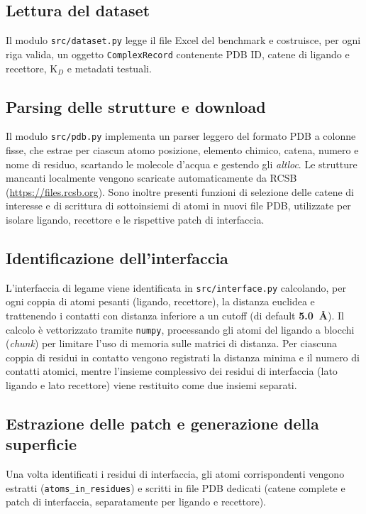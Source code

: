 \documentclass[11pt,a4paper]{article}
\begin{document}
\subsection{Lettura del dataset}
Il modulo \texttt{src/dataset.py} legge il file Excel del benchmark e costruisce, per ogni riga valida, un oggetto \texttt{ComplexRecord} contenente PDB ID, catene di ligando e recettore, K$_D$ e metadati testuali. 

\subsection{Parsing delle strutture e download}
Il modulo \texttt{src/pdb.py} implementa un parser leggero del formato PDB a colonne fisse, che estrae per ciascun atomo posizione, elemento chimico, catena, numero e nome di residuo, scartando le molecole d'acqua e gestendo gli \emph{altloc}. Le strutture mancanti localmente vengono scaricate automaticamente da RCSB (\url{https://files.rcsb.org}). Sono inoltre presenti funzioni di selezione delle catene di interesse e di scrittura di sottoinsiemi di atomi in nuovi file PDB, utilizzate per isolare ligando, recettore e le rispettive patch di interfaccia.

\subsection{Identificazione dell'interfaccia}
\label{sec:interface}
L'interfaccia di legame viene identificata in \texttt{src/interface.py} calcolando, per ogni coppia di atomi pesanti (ligando, recettore), la distanza euclidea e trattenendo i contatti con distanza inferiore a un cutoff (di default \textbf{5.0~\r{A}}). Il calcolo è vettorizzato tramite \texttt{numpy}, processando gli atomi del ligando a blocchi (\emph{chunk}) per limitare l'uso di memoria sulle matrici di distanza. Per ciascuna coppia di residui in contatto vengono registrati la distanza minima e il numero di contatti atomici, mentre l'insieme complessivo dei residui di interfaccia (lato ligando e lato recettore) viene restituito come due insiemi separati.

\subsection{Estrazione delle patch e generazione della superficie}
Una volta identificati i residui di interfaccia, gli atomi corrispondenti vengono estratti (\texttt{atoms\_in\_residues}) e scritti in file PDB dedicati (catene complete e patch di interfaccia, separatamente per ligando e recettore).
\end{document}
